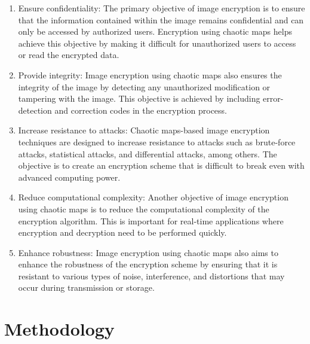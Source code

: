 \documentclass[12pt,a4paper,english]{article}
\begin{document}
\begin{enumerate}
    \item Ensure confidentiality: The primary objective of image encryption is to ensure that the information contained within the image remains confidential and can only be accessed by authorized users. Encryption using chaotic maps helps achieve this objective by making it difficult for unauthorized users to access or read the encrypted data.

    \item Provide integrity: Image encryption using chaotic maps also ensures the integrity of the image by detecting any unauthorized modification or tampering with the image. This objective is achieved by including error-detection and correction codes in the encryption process.

    \item Increase resistance to attacks: Chaotic maps-based image encryption techniques are designed to increase resistance to attacks such as brute-force attacks, statistical attacks, and differential attacks, among others. The objective is to create an encryption scheme that is difficult to break even with advanced computing power.

    \item Reduce computational complexity: Another objective of image encryption using chaotic maps is to reduce the computational complexity of the encryption algorithm. This is important for real-time applications where encryption and decryption need to be performed quickly.

    \item Enhance robustness: Image encryption using chaotic maps also aims to enhance the robustness of the encryption scheme by ensuring that it is resistant to various types of noise, interference, and distortions that may occur during transmission or storage.
\end{enumerate}
\newpage
\section{Methodology}
\end{document}
